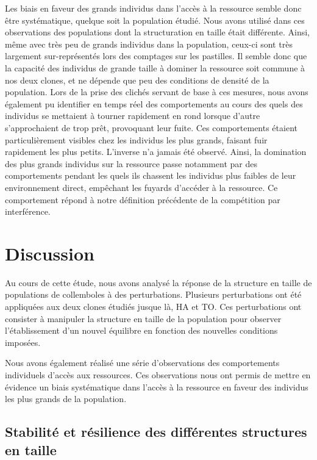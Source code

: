 Les biais en faveur des grands individus dans l'accès à la ressource semble donc
être systématique, quelque soit la population étudié. Nous avons utilisé dans
ces observations des populations dont la structuration en taille était
différente.
Ainsi, même avec très peu de grands individus dans la population, ceux-ci sont
très largement sur-représentés lors des comptages sur les pastilles. Il semble
donc que la capacité des individus de grande taille à dominer la ressource soit
commune à nos deux clones, et ne dépende que peu des conditions de densité de la
population. Lors de la prise des clichés servant de base à ces mesures, nous
avons également pu identifier en temps réel des comportements au cours des quels
des individus se mettaient à tourner rapidement en rond lorsque d'autre
s'approchaient de trop prêt, provoquant leur fuite. Ces comportements étaient
particulièrement visibles chez les individus les plus grands, faisant fuir
rapidement les plus petits. L'inverse n'a jamais été observé. Ainsi, la
domination des plus grands individus sur la ressource passe notamment par des
comportements pendant les quels ils chassent les individus plus faibles de leur
environnement direct, empêchant les fuyards d'accéder à la ressource. Ce
comportement répond à notre définition précédente de la compétition par
interférence. 

\section{Discussion}

Au cours de cette étude, nous avons analysé la réponse de la structure en taille
de populations de collemboles à des perturbations. Plusieurs perturbations ont
été appliquées aux deux clones étudiés jusque là, HA et TO. Ces perturbations
ont consister à manipuler la structure en taille de la population pour observer
l'établissement d'un nouvel équilibre en fonction des nouvelles conditions
imposées. 

Nous avons également réalisé une série d'observations des
comportements individuels d'accès aux ressources. Ces observations nous ont
permis de mettre en évidence un biais systématique dans l'accès à la ressource
en faveur des individus les plus grands de la population. 

\subsection{Stabilité et résilience des différentes structures en taille}

